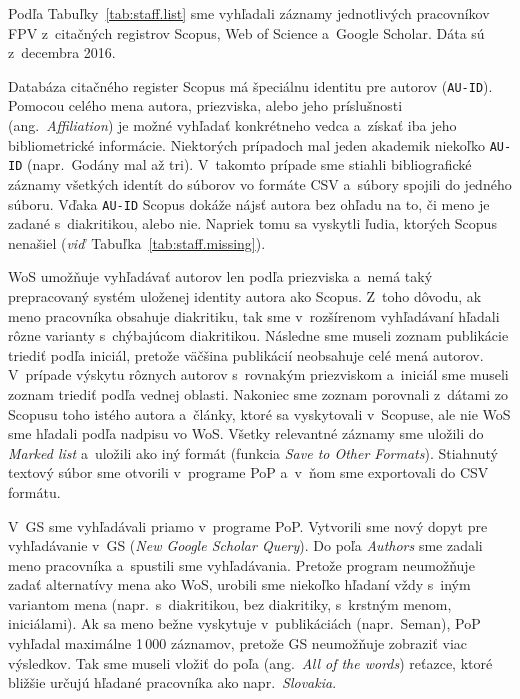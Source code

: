 Podľa Tabuľky~\ref{tab:staff.list} sme vyhľadali záznamy jednotlivých
pracovníkov FPV z~citačných registrov Scopus, Web of Science a~Google Scholar.
Dáta sú z~decembra 2016.

Databáza citačného register Scopus má špeciálnu identitu pre autorov
(\texttt{AU-ID}).  Pomocou celého mena autora, priezviska, alebo jeho
príslušnosti (ang.~\emph{Affiliation}) je možné vyhľadať konkrétneho vedca
a~získať iba jeho bibliometrické informácie.  Niektorých prípadoch mal jeden
akademik niekoľko \texttt{AU-ID} (napr.~Godány mal až tri).  V~takomto prípade
sme stiahli bibliografické záznamy všetkých identít do súborov vo formáte CSV
a~súbory spojili do jedného súboru.  Vďaka \texttt{AU-ID} Scopus dokáže nájsť
autora bez ohľadu na to, či meno je zadané s~diakritikou, alebo nie.  Napriek
tomu sa vyskytli ľudia, ktorých Scopus nenašiel
(\emph{viď}~Tabuľka~\ref{tab:staff.missing}).

WoS umožňuje vyhľadávať autorov len podľa priezviska a~nemá taký prepracovaný
systém uloženej identity autora ako Scopus.  Z~toho dôvodu, ak meno pracovníka
obsahuje diakritiku, tak sme v~rozšírenom vyhľadávaní hľadali rôzne varianty
s~chýbajúcom diakritikou.  Následne sme museli zoznam publikácie triediť podľa
iniciál, pretože väčšina publikácií neobsahuje celé mená autorov.  V~prípade
výskytu rôznych autorov s~rovnakým priezviskom a~iniciál sme museli zoznam
triediť podľa vednej oblasti.  Nakoniec sme zoznam porovnali z~dátami zo Scopusu
toho istého autora a~články, ktoré sa vyskytovali v~Scopuse, ale nie WoS sme
hľadali podľa nadpisu vo WoS.  Všetky relevantné záznamy sme uložili do
\emph{Marked list} a~uložili ako iný formát (funkcia \emph{Save to Other
  Formats}).  Stiahnutý textový súbor sme otvorili v~programe PoP a~v~ňom sme
exportovali do CSV formátu.

V~GS sme vyhľadávali priamo v~programe PoP.  Vytvorili sme nový dopyt pre
vyhľadávanie v~GS (\emph{New Google Scholar Query}).  Do poľa \emph{Authors} sme
zadali meno pracovníka a~spustili sme vyhľadávania.  Pretože program neumožňuje
zadať alternatívy mena ako WoS, urobili sme niekoľko hľadaní vždy s~iným
variantom mena (napr.~s~diakritikou, bez diakritiky, s~krstným menom,
iniciálami).  Ak sa meno bežne vyskytuje v~publikáciách (napr.~Seman), PoP
vyhľadal maximálne 1\,000 záznamov, pretože GS neumožňuje zobraziť viac
výsledkov.  Tak sme museli vložiť do poľa  (ang.~\emph{All of
  the words}) reťazce, ktoré bližšie určujú hľadané pracovníka ako
napr.~\emph{Slovakia}.

